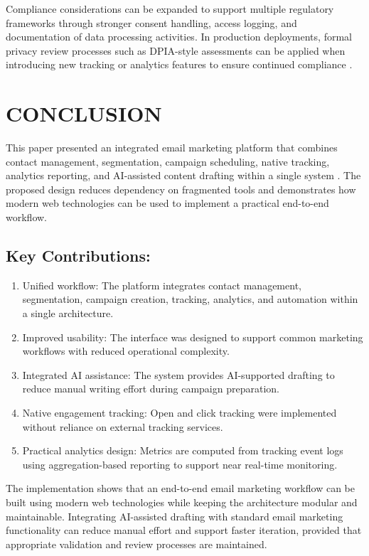 \documentclass[12pt,journal,compsoc]{IEEEtran}
\begin{document}
Compliance considerations can be expanded to support multiple regulatory frameworks through stronger consent handling, access logging, and documentation of data processing activities. In production deployments, formal privacy review processes such as DPIA-style assessments can be applied when introducing new tracking or analytics features to ensure continued compliance \cite{ref21}.

\section{CONCLUSION}
This paper presented an integrated email marketing platform that combines contact management, segmentation, campaign scheduling, native tracking, analytics reporting, and AI-assisted content drafting within a single system \cite{ref1,ref3}. The proposed design reduces dependency on fragmented tools and demonstrates how modern web technologies can be used to implement a practical end-to-end workflow.

\subsection*{Key Contributions:}
\begin{enumerate}
	\item Unified workflow: The platform integrates contact management, segmentation, campaign creation, tracking, analytics, and automation within a single architecture.
	\item Improved usability: The interface was designed to support common marketing workflows with reduced operational complexity.
	\item Integrated AI assistance: The system provides AI-supported drafting to reduce manual writing effort during campaign preparation.
	\item Native engagement tracking: Open and click tracking were implemented without reliance on external tracking services.
	\item Practical analytics design: Metrics are computed from tracking event logs using aggregation-based reporting to support near real-time monitoring.
\end{enumerate}

The implementation shows that an end-to-end email marketing workflow can be built using modern web technologies while keeping the architecture modular and maintainable. Integrating AI-assisted drafting with standard email marketing functionality can reduce manual effort and support faster iteration, provided that appropriate validation and review processes are maintained.
\end{document}
